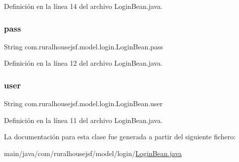 Definición en la línea 14 del archivo Login\+Bean.\+java.

\mbox{\label{classcom_1_1ruralhousejsf_1_1model_1_1login_1_1_login_bean_a4abf487aa0d370809a4f737dd87dbdd7}} 
\subsubsection{\texorpdfstring{pass}{pass}}
{\footnotesize\ttfamily String com.\+ruralhousejsf.\+model.\+login.\+Login\+Bean.\+pass\hspace{0.3cm}{\ttfamily [private]}}



Definición en la línea 12 del archivo Login\+Bean.\+java.

\mbox{\label{classcom_1_1ruralhousejsf_1_1model_1_1login_1_1_login_bean_a06e00e34aacd95ab04a33bae5bc50b34}} 
\subsubsection{\texorpdfstring{user}{user}}
{\footnotesize\ttfamily String com.\+ruralhousejsf.\+model.\+login.\+Login\+Bean.\+user\hspace{0.3cm}{\ttfamily [private]}}



Definición en la línea 11 del archivo Login\+Bean.\+java.



La documentación para esta clase fue generada a partir del siguiente fichero\+:\begin{DoxyCompactItemize}
\item 
main/java/com/ruralhousejsf/model/login/\mbox{\hyperlink{_login_bean_8java}{Login\+Bean.\+java}}\end{DoxyCompactItemize}

